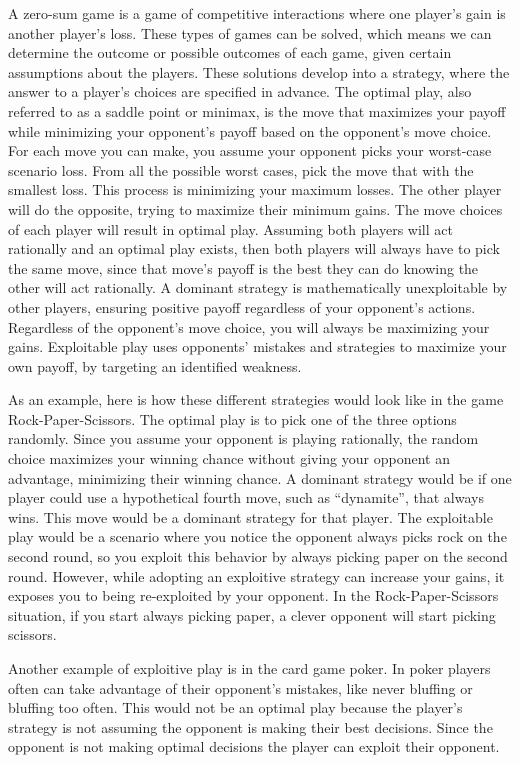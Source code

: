 \documentclass[12pt]{article}
\begin{document}
\begin{thesis}
A zero-sum game is a game of competitive interactions where one player's gain is another player's loss.
These types of games can be solved, which means we can determine the outcome or possible outcomes of each game, given certain assumptions about the players.
These solutions develop into a strategy, where the answer to a player's choices are specified in advance.
The optimal play, also referred to as a saddle point or minimax, is the move that maximizes your payoff while minimizing your opponent's payoff based on the opponent's move choice.
For each move you can make, you assume your opponent picks your worst-case scenario loss.
From all the possible worst cases, pick the move that with the smallest loss.
This process is minimizing your maximum losses.
The other player will do the opposite, trying to maximize their minimum gains.
The move choices of each player will result in optimal play.
Assuming both players will act rationally and an optimal play exists, then both players will always have to pick the same move, since that move's payoff is the best they can do knowing the other will act rationally.
A dominant strategy is mathematically unexploitable by other players, ensuring positive payoff regardless of your opponent's actions.
Regardless of the opponent's move choice, you will always be maximizing your gains.
Exploitable play uses opponents' mistakes and strategies to maximize your own payoff, by targeting an identified weakness.

As an example, here is how these different strategies would look like in the game Rock-Paper-Scissors.
The optimal play is to pick one of the three options randomly.
Since you assume your opponent is playing rationally, the random choice maximizes your winning chance without giving your opponent an advantage, minimizing their winning chance.
A dominant strategy would be if one player could use a hypothetical fourth move, such as ``dynamite'', that always wins.
This move would be a dominant strategy for that player.
The exploitable play would be a scenario where you notice the opponent always picks rock on the second round, so you exploit this behavior by always picking paper on the second round.
However, while adopting an exploitive strategy can increase your gains, it exposes you to being re-exploited by your opponent.
In the Rock-Paper-Scissors situation, if you start always picking paper, a clever opponent will start picking scissors.

Another example of exploitive play is in the card game poker. In poker players often can take advantage of their opponent's mistakes, like never bluffing or bluffing too often. This would not be an optimal play because the player's strategy is not assuming the opponent is making their best decisions. Since the opponent is not making optimal decisions the player can exploit their opponent.


\end{thesis}
\end{document}
